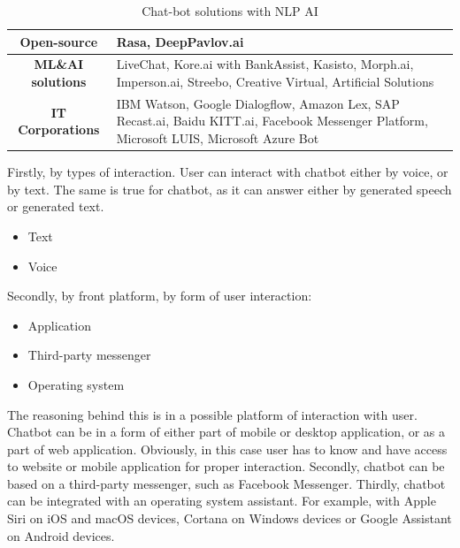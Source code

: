 \begin{table}
    \centering
    \caption{Chat-bot solutions with NLP AI}
    \begin{tabular}{|c|p{10cm}|}
        \hline
        \textbf{Open-source} & Rasa, DeepPavlov.ai \\
        \hline
        \textbf{ML\&AI solutions} & LiveChat, Kore.ai with BankAssist, Kasisto, \newline Morph.ai, Imperson.ai, Streebo, \newline Creative Virtual, Artificial Solutions \\
        \hline
        \textbf{IT Corporations} & IBM Watson, Google Dialogflow, Amazon Lex, \newline SAP Recast.ai, Baidu KITT.ai, \newline Facebook Messenger Platform, \newline Microsoft LUIS, Microsoft Azure Bot \\
        \hline
    \end{tabular}
    \medskip
\end{table}


Firstly, by types of interaction.
User can interact with chatbot either by voice, or by text.
The same is true for chatbot, as it can answer either by generated speech or generated text.
\begin{itemize}
    \item Text
    \item Voice 
\end{itemize}

Secondly, by front platform, by form of user interaction:
\begin{itemize}
    \item Application 
    \item Third-party messenger
    \item Operating system
\end{itemize}

The reasoning behind this is in a possible platform of interaction with user.
Chatbot can be in a form of either part of mobile or desktop application, or as a part of web application.
Obviously, in this case user has to know and have access to website or mobile application for proper interaction.
Secondly, chatbot can be based on a third-party messenger, such as Facebook Messenger.
Thirdly, chatbot can be integrated with an operating system assistant.
For example, with Apple Siri on iOS and macOS devices, Cortana on Windows devices or Google Assistant on Android devices.

